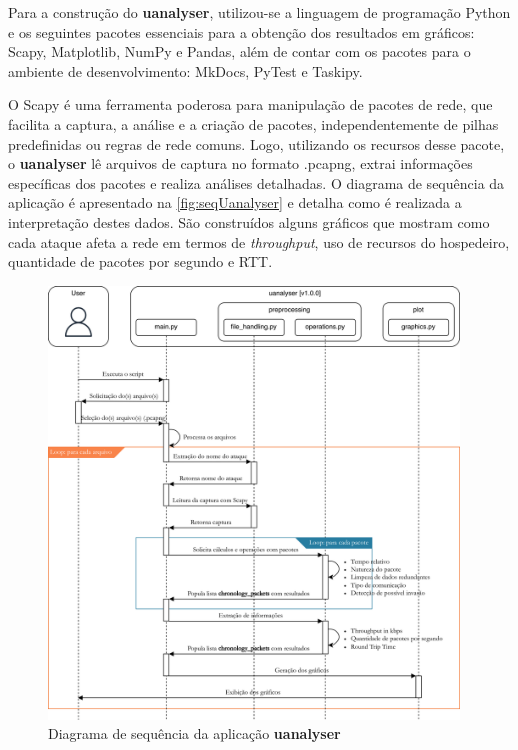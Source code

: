     Para a construção do \textbf{uanalyser}, utilizou-se a linguagem de programação Python e os seguintes pacotes essenciais para a obtenção dos resultados em gráficos: Scapy, Matplotlib, NumPy e Pandas, além de contar com os pacotes para o ambiente de desenvolvimento: MkDocs, PyTest e Taskipy.

    O Scapy é uma ferramenta poderosa para manipulação de pacotes de rede, que facilita a captura, a análise e a criação de pacotes, independentemente de pilhas predefinidas ou regras de rede comuns. Logo, utilizando os recursos desse pacote, o \textbf{uanalyser} lê arquivos de captura no formato .pcapng, extrai informações específicas dos pacotes e realiza análises detalhadas. O diagrama de sequência da aplicação é apresentado na \autoref{fig:seqUanalyser} e detalha como é realizada a interpretação destes dados. São construídos alguns gráficos que mostram como cada ataque afeta a rede em termos de \textit{throughput}, uso de recursos do hospedeiro, quantidade de pacotes por segundo e RTT.

    \begin{figure}[htbp!]
        \caption{\label{fig:seqUanalyser}Diagrama de sequência da aplicação \textbf{uanalyser}}
        \begin{center}
            \includegraphics[width=0.972\textwidth]{USPSC-img/seqUanalyser.png}
        \end{center}
    \end{figure}

